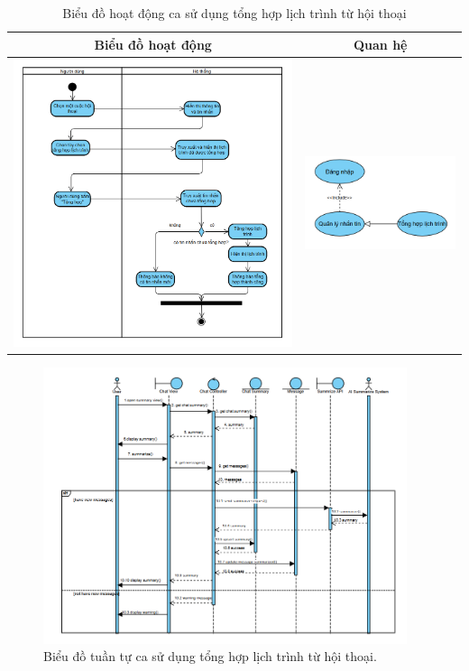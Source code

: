 \begin{table}[H] %
    \centering
    \caption{Biểu đồ hoạt động ca sử dụng tổng hợp lịch trình từ hội thoại} %
    \label{tab:uc_summarize_itinerary_diagrams} %
    \begin{tabular}{| c | c |}
        \hline
        \textbf{Biểu đồ hoạt động} & \textbf{Quan hệ} \\
        \hline
        \includegraphics[width=0.5\linewidth]{figures/c3/3-3-10-ad.png} %
        &
        \includegraphics[width=0.45\linewidth]{figures/c3/3-3-10-rd.png} \\ %
        \hline
    \end{tabular}
\end{table}

\begin{figure}[H]
    \centering
    \includegraphics[width=0.95\textwidth]{figures/c3/3-3-10-sd.png} %
    \caption{Biểu đồ tuần tự ca sử dụng tổng hợp lịch trình từ hội thoại.}
    \label{fig:3-3-10-sequence-diagram}
\end{figure}